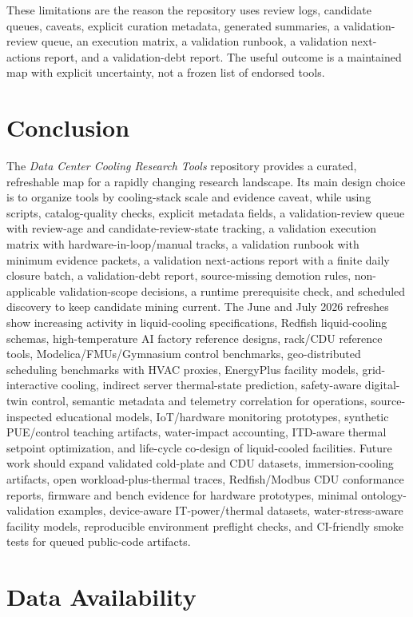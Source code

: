 \documentclass[11pt]{article}
\begin{document}
These limitations are the reason the repository uses review logs, candidate queues, caveats, explicit curation metadata, generated summaries, a validation-review queue, an execution matrix, a validation runbook, a validation next-actions report, and a validation-debt report. The useful outcome is a maintained map with explicit uncertainty, not a frozen list of endorsed tools.

\section{Conclusion}

The \emph{Data Center Cooling Research Tools} repository provides a curated, refreshable map for a rapidly changing research landscape. Its main design choice is to organize tools by cooling-stack scale and evidence caveat, while using scripts, catalog-quality checks, explicit metadata fields, a validation-review queue with review-age and candidate-review-state tracking, a validation execution matrix with hardware-in-loop/manual tracks, a validation runbook with minimum evidence packets, a validation next-actions report with a finite daily closure batch, a validation-debt report, source-missing demotion rules, non-applicable validation-scope decisions, a runtime prerequisite check, and scheduled discovery to keep candidate mining current. The June and July 2026 refreshes show increasing activity in liquid-cooling specifications, Redfish liquid-cooling schemas, high-temperature AI factory reference designs, rack/CDU reference tools, Modelica/FMUs/Gymnasium control benchmarks, geo-distributed scheduling benchmarks with HVAC proxies, EnergyPlus facility models, grid-interactive cooling, indirect server thermal-state prediction, safety-aware digital-twin control, semantic metadata and telemetry correlation for operations, source-inspected educational models, IoT/hardware monitoring prototypes, synthetic PUE/control teaching artifacts, water-impact accounting, ITD-aware thermal setpoint optimization, and life-cycle co-design of liquid-cooled facilities. Future work should expand validated cold-plate and CDU datasets, immersion-cooling artifacts, open workload-plus-thermal traces, Redfish/Modbus CDU conformance reports, firmware and bench evidence for hardware prototypes, minimal ontology-validation examples, device-aware IT-power/thermal datasets, water-stress-aware facility models, reproducible environment preflight checks, and CI-friendly smoke tests for queued public-code artifacts.

\section*{Data Availability}
\end{document}
